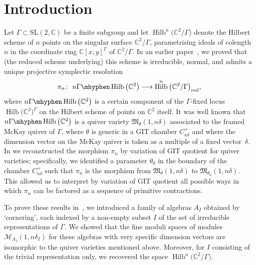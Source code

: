 \documentclass[pdftex]{sigma}%
\newcommand{\SC}{\mathbb{C}} %
\newcommand{\PiQ}{A}
\DeclareMathOperator{\Hilb}{\mathrm{Hilb}}
\numberwithin{equation}{section}
\newcommand{\ngammahilb}{n\Gamma\mhyphen\Hilb\big(\SC^2\big)}
\begin{document}

\renewcommand{\thefootnote}{\arabic{footnote}}
\setcounter{footnote}{0}

\section{Introduction}\label{sec:intro}

Let $\Gamma\subset{\mathrm{SL}}(2,\SC)$ be a finite subgroup and let $\Hilb^n\big(\SC^2/\Gamma\big)$ denote the Hilbert scheme of $n$ points on the singular surface $\SC^2/\Gamma$, parametrising
ideals of colength $n$ in the coordinate ring $\SC[x,y]^\Gamma$ of $\SC^2/\Gamma$. In an earlier paper~\cite{craw2019punctual}, we proved that (the reduced scheme underlying) this scheme is irreducible, normal, and admits a unique projective symplectic resolution
\[ \pi_n\colon \ \ngammahilb \longrightarrow \Hilb^n\big(\SC^2/\Gamma\big)_{\rm red},
\]
where $\ngammahilb$ is a certain component of the $\Gamma$-fixed locus
$\Hilb\big(\SC^2\big)^\Gamma$ on the Hilbert scheme of points on
$\SC^2$ itself. It was well known that $\ngammahilb$ is a quiver variety $\mathfrak{M}_{\theta}(1,n\delta)$ associated to the framed McKay quiver of $\Gamma$, where $\theta$ is generic in a GIT chamber $C_{n \delta}^+$ and where the dimension vector on the McKay quiver is taken as a multiple of a fixed vector~$\delta$.
In \cite[Theorem~1.1]{craw2019punctual} we reconstructed
the morphism $\pi_n$ by variation of GIT quotient for quiver varieties; specifically, we identified a parameter $\theta_0$ in the boundary of the chamber $C_{n \delta}^+$ such that $\pi_n$ is the morphism from $\mathfrak{M}_{\theta}(1,n\delta)$ to $\mathfrak{M}_{\theta_0}(1,n\delta)$. This allowed us to interpret by variation of GIT quotient all possible ways in which $\pi_n$ can be factored as a sequence of primitive contractions.

To prove these results in~\cite{craw2019punctual}, we introduced
a family of algebras $\PiQ_I$ obtained by `cornering', each
indexed by a non-empty subset $I$ of the set of irreducible
representations of $\Gamma$. We showed
that the fine moduli spaces of modules $\mathcal{M}_{\PiQ_I}(1,n\delta_I)$
for these algebras with very specific dimension vectors
are isomorphic to the quiver varieties mentioned above.
Moreover, for $I$ consisting of the trivial
representation only, we recovered the space $\Hilb^n\big(\SC^2/\Gamma\big)$.
\end{document}
